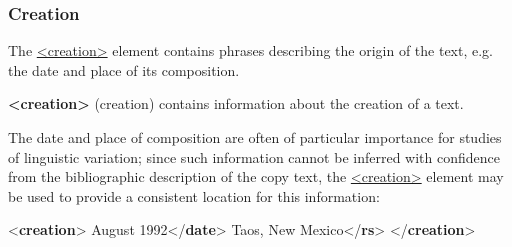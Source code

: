 \subsubsection[{Creation}]{Creation}\label{HD4C}\par
The \hyperref[TEI.creation]{<creation>} element contains phrases describing the origin of the text, e.g. the date and place of its composition. 
\begin{sansreflist}
  
\item [\textbf{<creation>}] (creation) contains information about the creation of a text.
\end{sansreflist}
 The date and place of composition are often of particular importance for studies of linguistic variation; since such information cannot be inferred with confidence from the bibliographic description of the copy text, the \hyperref[TEI.creation]{<creation>} element may be used to provide a consistent location for this information: \par\bgroup{}\exampleFont \begin{shaded}\noindent\mbox{}{<\textbf{creation}>}\mbox{}\newline 
{}August 1992{</\textbf{date}>}\mbox{}\newline 
{}Taos, New Mexico{</\textbf{rs}>}\mbox{}\newline 
{</\textbf{creation}>}\end{shaded}\egroup\par 
